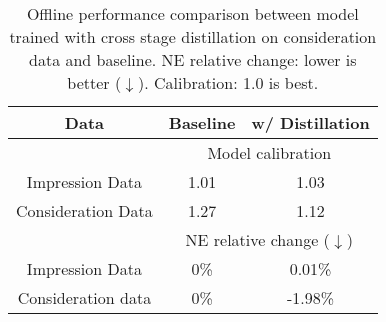 \begin{table}[t]
    \caption{Offline performance comparison between model trained with cross stage distillation on consideration data and baseline.
    NE relative change: lower is better ($\downarrow$).
    Calibration: 1.0 is best.
    }
    \label{cross_stage_cd_distill}
    \centering
    \begin{tabular}{ccc}
    \toprule
     Data & Baseline &  w/ Distillation\\
    \toprule
     &\multicolumn{2}{c}{Model calibration}\\
    \midrule
    Impression Data & 1.01 & 1.03 \\
    \hline
    Consideration Data & 1.27 & 1.12 \\
    \toprule
     &\multicolumn{2}{c}{NE relative change ($\downarrow$)}\\
    \midrule
    Impression Data & 0\% & 0.01\%  \\
    \hline
    Consideration data & 0\% & -1.98\%  \\
    \bottomrule
    \end{tabular}
\end{table}